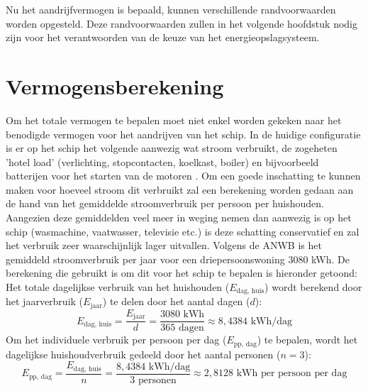 
\noindent Nu het aandrijfvermogen is bepaald, kunnen verschillende randvoorwaarden worden opgesteld. Deze randvoorwaarden zullen in het volgende hoofdstuk nodig zijn voor het verantwoorden van de keuze van het energieopslagsysteem.

\section{Vermogensberekening}

\noindent Om het totale vermogen te bepalen moet niet enkel worden gekeken naar het benodigde vermogen voor het aandrijven van het schip. In de huidige configuratie is er op het schip het volgende aanwezig wat stroom verbruikt, de zogeheten 'hotel load' (verlichting, stopcontacten, koelkast, boiler) en bijvoorbeeld batterijen voor het starten van de motoren \cite{vanbaalen2026interview}. Om een goede inschatting te kunnen maken voor hoeveel stroom dit verbruikt zal een berekening worden gedaan aan de hand van het gemiddelde stroomverbruik per persoon per huishouden. Aangezien deze gemiddelden veel meer in weging nemen dan aanwezig is op het schip (wasmachine, vaatwasser, televisie etc.) is deze schatting conservatief en zal het verbruik zeer waarschijnlijk lager uitvallen. Volgens de ANWB \cite{ANWBEnergieverbruik} is het gemiddeld stroomverbruik per jaar voor een driepersoonswoning 3080 kWh. De berekening die gebruikt is om dit voor het schip te bepalen is hieronder getoond:
Het totale dagelijkse verbruik van het huishouden ($E_{\text{dag, huis}}$) wordt berekend door het jaarverbruik ($E_{\text{jaar}}$) te delen door het aantal dagen ($d$):
\begin{equation}
E_{\text{dag, huis}} = \frac{E_{\text{jaar}}}{d} = \frac{3080 \text{ kWh}}{365 \text{ dagen}} \approx 8{,}4384 \text{ kWh/dag}
\end{equation}
Om het individuele verbruik per persoon per dag ($E_{\text{pp, dag}}$) te bepalen, wordt het dagelijkse huishoudverbruik gedeeld door het aantal personen ($n = 3$):
\begin{equation}
E_{\text{pp, dag}} = \frac{E_{\text{dag, huis}}}{n} = \frac{8{,}4384 \text{ kWh/dag}}{3 \text{ personen}} \approx 2{,}8128 \text{ kWh per persoon per dag}
\end{equation}

